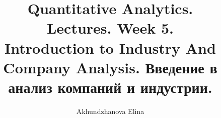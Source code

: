 \documentclass{article}
\title{Quantitative Analytics.\\
	Lectures. Week 5. \\
	Introduction to Industry And Company Analysis. Введение в анализ компаний и индустрии.}
\author{Akhundzhanova Elina}
\begin{document}
	\maketitle
	
	\setcounter{tocdepth}{2} %
	\renewcommand\contentsname{Содержание}
	\tableofcontents
	\newpage
	
	
	
	
	\renewcommand{\labelitemi}{\tiny$\bullet$}
	\renewcommand{\figurename}{Рис.}
	
\end{document}
